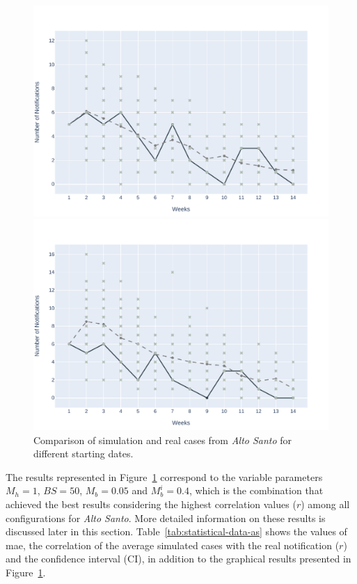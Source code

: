 \begin{figure}[!ht]
\begin{minipage}[c]{.45\textwidth}
		\includegraphics[scale=0.4]{images/experiments-as/AS-2021-05-30.pdf}
	\end{minipage}
	\hspace{0.5cm}
	\begin{minipage}[c]{.45\textwidth}
		\centering
		\includegraphics[scale=0.4]{images/experiments-as/AS-2021-06-06.pdf}
	\end{minipage}
	\caption{\label{fig:avg-result-2017-01-as} Comparison of simulation and real cases from \textit{Alto Santo} for different starting dates.}
\end{figure}

The results represented in Figure~\ref{fig:avg-result-2017-01-as} correspond to
the variable parameters $M_h = 1$, $BS = 50$, $M_b = 0.05$ and $M_b^{i} = 0.4$,
which is the combination that achieved the best results considering the highest
correlation values ($r$) among all configurations for \textit{Alto Santo}. More
detailed information on these results is discussed later in this section.
%
Table~\ref{tab:statistical-data-as} shows the values of \gls{mae}, the
correlation of the average simulated cases with the real notification ($r$) and
the confidence interval (CI), in addition to the graphical results presented in
Figure~\ref{fig:avg-result-2017-01-as}.

